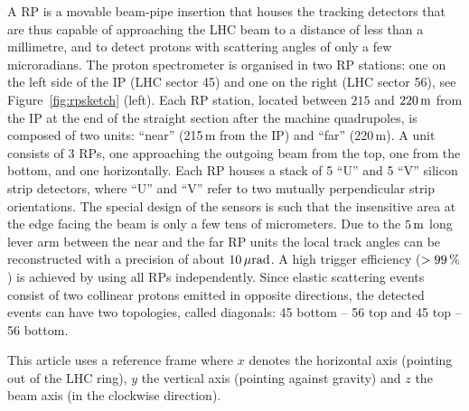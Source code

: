 A RP is a movable beam-pipe insertion that houses the tracking detectors that are thus capable of approaching the LHC beam to a distance of less than a millimetre, and to detect protons with scattering angles of only a few microradians. The proton spectrometer is organised in two RP stations: one on the left side of the IP (LHC sector 45) and one on the right (LHC sector 56), see Figure~\ref{fig:rpsketch} (left). Each RP station, located between $215$ and $220\,{\rm m}$ %
from the IP at the end of the straight section after the machine quadrupoles, is composed of two units: ``near'' (215\,m from the IP) and ``far'' (220\,m). A unit consists of 3 RPs, one approaching the outgoing beam from the top, one from the bottom, and one horizontally. Each RP houses a stack of 5 ``U'' and 5 ``V'' silicon strip detectors, where ``U'' and ``V'' refer to two mutually perpendicular strip orientations. The special design of the sensors is such that the insensitive area at the edge facing the beam is only a few tens of micrometers. Due to the $5\,{\rm m}$ %
 long lever arm between the near and the far RP units the local track angles can be reconstructed with a precision of about $10\,{\rm \mu rad}$. %
A high trigger efficiency ($> 99\,{\rm \%}$) is achieved by using all RPs independently. %
Since elastic scattering events consist of two collinear protons emitted in opposite directions, the detected events can have two topologies, called diagonals: 45 bottom -- 56 top and 45 top -- 56 bottom.

This article uses a reference frame where $x$ denotes the horizontal axis (pointing out of the LHC ring), $y$ the vertical axis (pointing against gravity) and $z$ the beam axis (in the clockwise direction).
